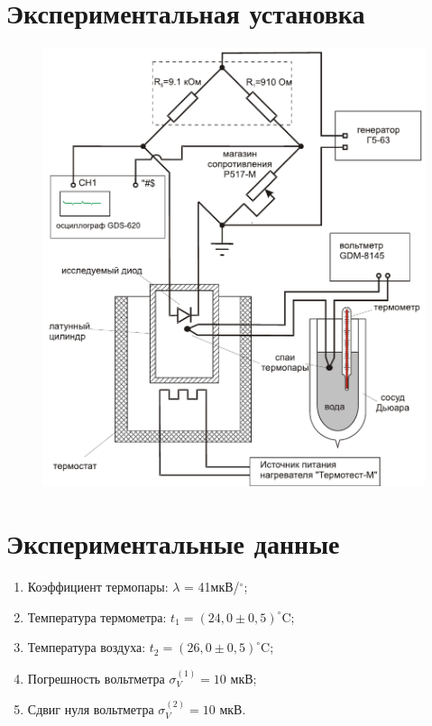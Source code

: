 \documentclass[a4paper,12pt]{article} %
\begin{document}
\section{Экспериментальная установка}
	\begin{figure}[h!]
		\begin{floatrow}
				{\includegraphics[scale=0.7]{ustanovka.pdf}}    
			\end{floatrow}
		\end{figure}
	
	
	
	\newpage
	\section{Экспериментальные данные}
		\begin{enumerate}
			\item
				Коэффициент термопары:
				$\lambda$ = 41мкВ/$^\circ$;
			\item
				Температура термометра: $t_1 = (24,0 \pm 0,5)^\circ$C;
			\item
				Температура воздуха: $t_2 = (26,0 \pm 0,5)^\circ$C;
			\item
				Погрешность вольтметра $\sigma_V^{(1)} = 10$ мкВ;
			\item
				Сдвиг нуля вольтметра $\sigma_V^{(2)} = 10$ мкВ.
		\end{enumerate}
		
\end{document}
